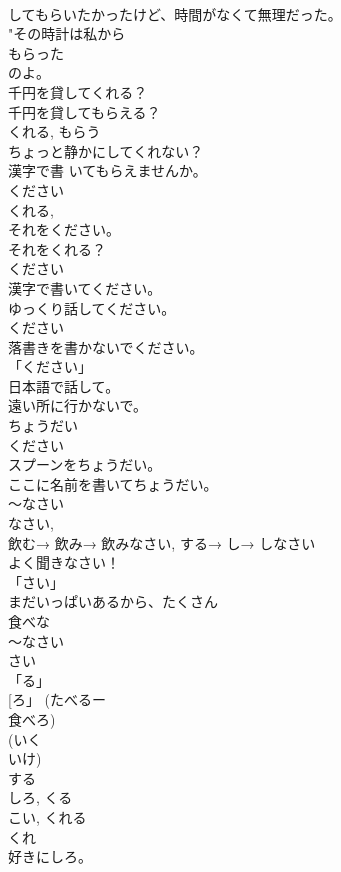 \documentclass[8pt]{extreport}
\begin{document}
\begin{CJK}{UTF8}{min}
\\	してもらいたかったけど、時間がなくて無理だった。	
\\	"その時計は私から
\\	もらった
\\	のよ。
\\	千円を貸してくれる？	
\\	千円を貸してもらえる？	
\\	くれる, もらう	
\\	ちょっと静かにしてくれない？ 
\\	漢字で書 いてもらえませんか。
\\	ください	
\\	くれる, 
\\	それをください。
\\	それをくれる？ 
\\	ください	
\\	漢字で書いてください。
\\	ゆっくり話してください。 
\\	ください	
\\	落書きを書かないでください。
\\	「ください」
\\	日本語で話して。
\\	遠い所に行かないで。
\\	ちょうだい	
\\	ください 
\\	スプーンをちょうだい。
\\	ここに名前を書いてちょうだい。 
\\	～なさい	
\\	なさい, 
\\	飲む→ 飲み→ 飲みなさい, する→ し→ しなさい 
\\	よく聞きなさい！
\\	「さい」
\\	まだいっぱいあるから、たくさん
\\	食べな
\\	～なさい
\\	さい 
\\	「る」
\\	[ろ」 (たべるー
\\	食べろ)
\\	(いく 
\\	いけ)
\\	する 
\\	しろ, くる 
\\	こい, くれる 
\\	くれ	
\\	好きにしろ。	

\end{CJK}
\end{document}
